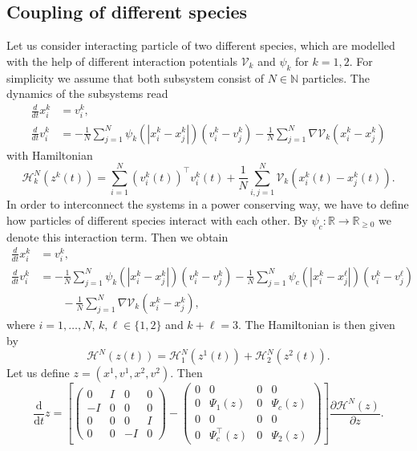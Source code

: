\documentclass[11pt]{article}
\newcommand{\N}[0]{\mathbb N}
\newcommand{\calH}[0]{\mathcal H}
\newcommand{\calV}[0]{\mathcal V}
\newcommand{\dd}[0]{\mathrm d}
\begin{document}
\begin{bibunit}[abbrv]
\subsection{Coupling of different species}
Let us consider interacting particle of two different species, which are modelled with the help of different interaction potentials $\calV_k$ and $\psi_k$ for $k=1,2.$ For simplicity we assume that both subsystem consist of $N\in\N$ particles. The dynamics of the subsystems read
\begin{align*}
    \frac{d}{dt} x_i^k &= v_i^k, \\
    \frac{d}{dt} v_i^k &= -\frac{1}{N} \sum_{j=1}^{N} \psi_k(| x_i^k - x_j^k  |)(v_i^k - v_j^k) - \frac{1}{N} \sum_{j=1}^{N} \nabla \calV_k(x_i^k - x_j^k)
\end{align*}
with Hamiltonian
$$ \calH^N_k(z^k(t)) = \sum_{i=1}^{N} (v_i^k(t))^\top v_i^k(t) + \frac{1}{N}\sum_{i,j=1}^{N} \calV_k(x_i^k(t) - x_j^k(t)).  $$
In order to interconnect the systems in a power conserving way, we have to define how particles of different species interact with each other. 
By $\psi_c:\mathbb R\rightarrow \mathbb R_{\ge 0}$ we denote this interaction term. Then we obtain 
\begin{align*}
    \frac{d}{dt} x_i^k &= v_i^k, \\
    \frac{d}{dt} v_i^k &= -\frac{1}{N} \sum_{j=1}^{N} \psi_k(| x_i^k - x_j^k |)(v_i^k - v_j^k) - \frac{1}{N} \sum_{j=1}^{N} \psi_{c}(| x_i^k - x_j^\ell |)(v_i^k - v_j^\ell) \\
    &\qquad - \frac{1}{N} \sum_{j=1}^{N} \nabla \calV_k(x_i^k - x_j^k),
\end{align*}
where $i=1,\ldots, N$, $k,\ell\in\{1,2\}$ and $k+\ell=3$.
The Hamiltonian is then given by
$$\calH^N(z(t)) = \calH_1^N(z^1(t)) + \calH_2^N(z^2(t)). 
$$
Let us define $z=(x^1, v^1, x^2, v^2).$ Then
\begin{equation}\label{eq:PHSparticle2}
\frac{\dd}{\dd t} z = \left[ \begin{pmatrix} 0 & I & 0 & 0  \\ -I & 0 & 0 & 0 \\ 0 & 0 & 0 & I \\ 0 & 0 & -I & 0  \end{pmatrix} - \begin{pmatrix} 0 & 0 & 0 & 0 \\ 0 & \Psi_1(z) & 0 & \Psi_{c}(z) \\  0 & 0 & 0 & 0 \\ 0 & \Psi_{c}^\top(z) & 0 & \Psi_{2}(z)\end{pmatrix} \right] \frac{\partial \calH^N(z)}{\partial z}. 

\end{equation}
\end{bibunit}
\end{document}

